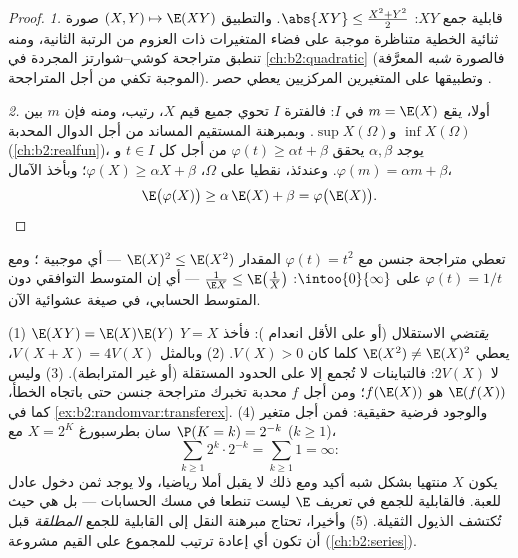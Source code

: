 \begin{proof}
\emph{1.} قابلية جمع $XY$: $\abs{XY} \leq \frac{X^2 + Y^2}2$. والتطبيق $(X, Y) \mapsto \E(XY)$ صورة ثنائية
الخطية متناظرة موجبة على فضاء المتغيرات ذات العزوم من الرتبة الثانية،
ومنه تنطبق متراجحة كوشي--شوارتز المجردة في \cref{ch:b2:quadratic} (فالصورة \emph{شبه} المعرَّفة
الموجبة تكفي من أجل المتراجحة). وتطبيقها على المتغيرين المركزيين
يعطي حصر .

\emph{2.} أولا، يقع $m = \E(X)$ في $I$: فالفترة $I$ تحوي جميع قيم
$X$،  رتيب، ومنه فإن $m$ بين $\inf X(\Omega)$ و$\sup X(\Omega)$.
وبمبرهنة المستقيم المساند من أجل الدوال المحدبة (\cref{ch:b2:realfun})، يوجد $\alpha, \beta$
يحقق $\varphi(t) \geq \alpha t + \beta$ من أجل كل $t \in I$ و$\varphi(m) = \alpha m + \beta$. وعندئذ، نقطيا على $\Omega$،
$\varphi(X) \geq \alpha X + \beta$؛ وبأخذ الآمال،
\[
\E\bigl(\varphi(X)\bigr) \geq \alpha\,\E(X) + \beta
= \varphi\bigl(\E(X)\bigr). \qedhere
\]
\end{proof}

\begin{example}
تعطي متراجحة جنسن مع $\varphi(t) = t^2$ المقدار $\E(X)^2 \leq \E(X^2)$ --- أي موجبية ؛
ومع $\varphi(t) = 1/t$ على $\intoo{0}{\infty}$: $\frac{1}{\E X} \leq \E\bigl(\frac1X\bigr)$ --- أي إن المتوسط التوافقي دون
المتوسط الحسابي، في صيغة عشوائية الآن.
\end{example}

\begin{remark}
(1) $\E(XY) = \E(X)\E(Y)$ \emph{يقتضي} الاستقلال (أو على الأقل انعدام ):
فأخذ $Y = X$ يعطي $\E(X^2) \neq
\E(X)^2$ كلما كان $V(X) > 0$. (2) وبالمثل $V(X + X) =
4V(X)$، لا
$2V(X)$: فالتباينات لا تُجمع إلا على الحدود المستقلة (أو غير
المترابطة). (3) وليس $\E(f(X))$ هو $f(\E(X))$؛ ومن أجل $f$ محدبة تخبرك
متراجحة جنسن حتى باتجاه الخطأ، كما في \cref{ex:b2:randomvar:transferex}. (4) والوجود فرضية
حقيقية: فمن أجل متغير سان بطرسبورغ $X = 2^K$ مع $\P(K = k) = 2^{-k}$ ($k \geq 1$)،
\[
\sum_{k\geq1}2^k\cdot2^{-k} = \sum_{k\geq1}1 = \infty :
\]
يكون $X$ منتهيا بشكل شبه أكيد ومع ذلك لا يقبل أملا رياضيا، ولا
يوجد ثمن دخول عادل للعبة. فالقابلية للجمع في تعريف $\E$ ليست
تنطعا في مسك الحسابات --- بل هي حيث تُكتشف الذيول الثقيلة. (5)
وأخيرا، تحتاج مبرهنة النقل إلى القابلية للجمع \emph{المطلقة} قبل أن
تكون أي إعادة ترتيب للمجموع على القيم مشروعة (\cref{ch:b2:series}).
\end{remark}


